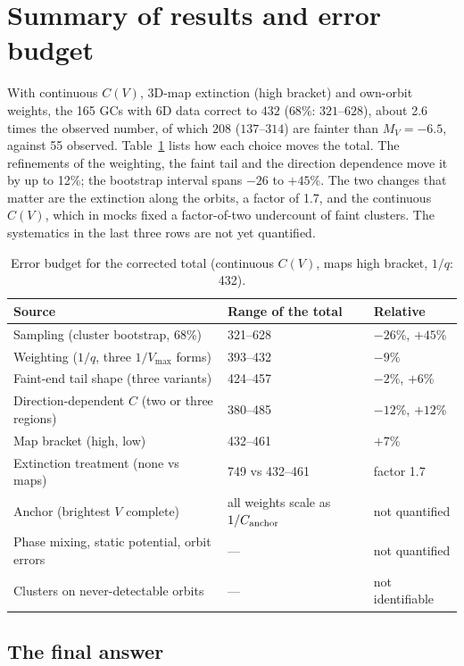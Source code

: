 \documentclass[11pt,a4paper]{article}
\newcommand{\MV}{M_V}
\begin{document}
\section{Summary of results and error budget}
\label{sec:budget}

With continuous $C(V)$, 3D-map extinction (high bracket) and own-orbit weights, the 165 GCs with 6D
data correct to $432$ ($68\%$: $321$--$628$), about 2.6 times the observed number, of which $208$
($137$--$314$) are fainter than $\MV=-6.5$, against 55 observed. Table~\ref{tab:budget} lists how
each choice moves the total. The refinements of the weighting, the faint tail and the direction
dependence move it by up to 12\%; the bootstrap interval spans $-26$ to $+45\%$. The two changes that
matter are the extinction along the orbits, a factor of 1.7, and the continuous $C(V)$, which in mocks
fixed a factor-of-two undercount of faint clusters. The systematics in the last three rows are not yet
quantified.

\begin{table}[h]
\centering
\caption{Error budget for the corrected total (continuous $C(V)$, maps high bracket, $1/q$: 432).}
\label{tab:budget}
\small
\begin{tabular}{lll}
\toprule
Source & Range of the total & Relative \\
\midrule
Sampling (cluster bootstrap, 68\%) & 321--628 & $-26$\%, $+45$\% \\
Weighting ($1/q$, three $1/V_{\max}$ forms) & 393--432 & $-9$\% \\
Faint-end tail shape (three variants) & 424--457 & $-2$\%, $+6$\% \\
Direction-dependent $C$ (two or three regions) & 380--485 & $-12$\%, $+12$\% \\
Map bracket (high, low) & 432--461 & $+7$\% \\
Extinction treatment (none vs maps) & 749 vs 432--461 & factor 1.7 \\
Anchor (brightest $V$ complete) & all weights scale as $1/C_{\rm anchor}$ & not quantified \\
Phase mixing, static potential, orbit errors & --- & not quantified \\
Clusters on never-detectable orbits & --- & not identifiable \\
\bottomrule
\end{tabular}
\end{table}

\subsection{The final answer}
\label{sec:final}
\end{document}
